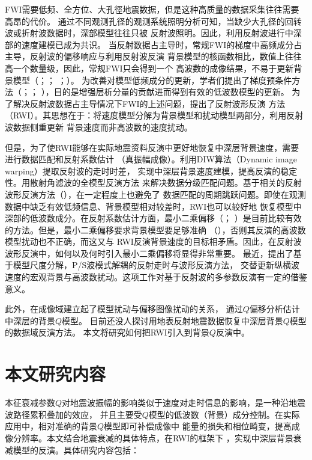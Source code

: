 FWI需要低频、全方位、大孔徑地震数据，但是这种高质量的数据采集往往需要高昂的代价。
通过不同观测孔径的观测系统照明分析可知，当缺少大孔径的回转波或折射波数据时，深部模型往往只被
反射波照明。因此，利用反射波进行中深部的速度建模已成为共识。
当反射数据占主导时，常规FWI的梯度中高频成分占主导，反射波的偏移响应与利用反射波反演
背景模型的核函数相比，数值上往往高一个数量级，因此，常规FWI只会得到一个
高波数的成像结果，不易于更新背景模型（；；
；）。
为改善对模型低频成分的更新，学者们提出了梯度预条件方法（；；
），目的是增强层析分量的贡献进而得到有效的低波数模型的更新。
为了解决反射波数据占主导情况下FWI的上述问题，提出了反射波形反演
方法（RWI）。其思想在于：将速度模型分解为背景模型和扰动模型两部分，利用反射波数据侧重更新
背景速度而非高波数的速度扰动。

但是，为了使RWI能够在实际地震资料反演中更好地恢复中深层背景速度，需要进行数据匹配和反射系数估计
（真振幅成像）。利用DIW算法（Dynamic image warping）提取反射波的走时时差，
实现中深层背景速度建模，提高反演的稳定性。用散射角滤波的全模型反演方法
来解决数据分级匹配问题。基于相关的反射波形反演方法（），在一定程度上也避免了
数据匹配的周期跳跃问题。即使在观测数据中缺乏有效低频信息、背景模型相对较差时，RWI也可以较好地
恢复模型中深部的低波数成分。在反射系数估计方面，最小二乘偏移（；
）是目前比较有效的方法。但是，最小二乘偏移要求背景模型要足够准确
（），否则其反演的高波数模型扰动也不正确，而这又与
RWI反演背景速度的目标相矛盾。因此，在反射波波形反演中，如何以及何时引入最小二乘偏移将显得非常重要。
最近，提出了基于模型尺度分解，P/S波模式解耦的反射走时与波形反演方法，
交替更新纵横波速度的宏观背景与高波数扰动。这项工作对基于反射波的多参数反演有一定的借鉴意义。

此外，在成像域建立起了模型扰动与偏移图像扰动的关系，
通过$Q$偏移分析估计中深层的背景$Q$模型。
目前还没人探讨用地表反射地震数据恢复中深层背景$Q$模型的数据域反演方法。
本文将研究如何把RWI引入到背景$Q$反演中。

\vspace{0.9cm}
\section{本文研究内容}
\vspace{0.5cm}

本征衰减参数$Q$对地震波振幅的影响类似于速度对走时信息的影响，是一种沿地震波路径累积叠加的效应，
并且主要受$Q$模型的低波数（背景）成分控制。在实际应用中，相对准确的背景$Q$模型即可补偿成像中
能量的损失和相位畸变，提高成像分辨率。本文结合地震衰减的具体特点，在RWI的框架下
，实现中深层背景衰减模型的反演。具体研究内容包括：

